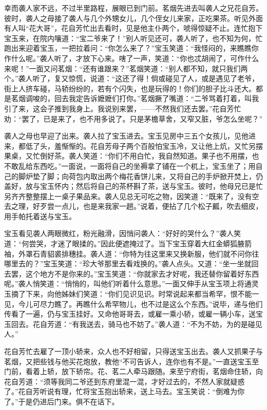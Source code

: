 \documentclass[12pt,oneside]{book}
\begin{document}
幸而袭人家不远，不过半里路程，展眼已到门前。茗烟先进去叫袭人之兄花自芳。彼时，袭人之母接了袭人与几个外甥女儿，几个侄女儿来家，正吃果茶。听见外面有人叫“花大哥”，花自芳忙出去看时，见是他主仆两个，唬得惊疑不止。连忙抱下宝玉来，在院内嚷道：“宝二爷来了！”别人听见还可，袭人听了，也不知为何，忙跑出来迎着宝玉，一把拉着问：“你怎么来了？”宝玉笑道：“我怪闷的，来瞧瞧你作什么呢。”袭人听了，才放下心来。嗐了一声，笑道：“你也忒胡闹了，可作什么来呢！”一面又问茗烟：“还有谁跟来？”茗烟笑道：“别人都不知，就只我们两个。”袭人听了，复又惊慌，说道：“这还了得！倘或碰见了人，或是遇见了老爷，街上人挤车碰，马轿纷纷的，若有个闪失，也是玩得的！你们的胆子比斗还大。都是茗烟调唆的，回去我定告诉嬷嬷们打你。”茗烟撅了嘴道：“二爷骂着打着，叫我引了来，这会子推到我身上。我说别来罢，——不然我们还去罢。”花自芳忙劝：“罢了，已是来了，也不用多说了。只是茅檐草舍，又窄又脏，爷怎么坐呢？”

袭人之母也早迎了出来。袭人拉了宝玉进去。宝玉见房中三五个女孩儿，见他进来，都低了头，羞惭惭的。花自芳母子两个百般怕宝玉冷，又让他上炕，又忙另摆果桌，又忙倒好茶。袭人笑道：“你们不用白忙，我自然知道。果子也不用摆，也不敢乱给东西吃。”一面说，一面将自己的坐褥拿了铺在一个杌上，宝玉坐了；用自己的脚炉垫了脚；向荷包内取出两个梅花香饼儿来，又将自己的手炉掀开焚上，仍盖好，放与宝玉怀内；然后将自己的茶杯斟了茶，送与宝玉。彼时，他母兄已是忙另齐齐整整摆上一桌子果品来。袭人见总无可吃之物，因笑道：“既来了，没有空去之理，好歹尝一点儿，也是来我家一趟。”说着，便拈了几个松子瓤，吹去细皮，用手帕托着送与宝玉。

宝玉看见袭人两眼微红，粉光融滑，因悄问袭人：“好好的哭什么？”袭人笑道：“何尝哭，才迷了眼揉的。”因此便遮掩过了。当下宝玉穿着大红金蟒狐腋箭袖，外罩石青貂裘排穗挂。袭人道：“你特为往这里来又换新服，他们就不问你往哪里去的？”宝玉笑道：“珍大爷那里去看戏换的。”袭人点头。又道：“坐一坐就回去罢，这个地方不是你来的。”宝玉笑道：“你就家去才好呢，我还替你留着好东西呢。”袭人悄笑道：“悄悄的，叫他们听着什么意思。”一面又伸手从宝玉项上将通灵玉摘了下来，向他姊妹们笑道：“你们见识见识。时常说起来都当希罕，恨不能一见，今儿可尽力瞧了。再瞧什么希罕物儿，也不过是这么个东西。”说毕，递与他们传看了一遍，仍与宝玉挂好。又命他哥哥去，或雇一乘小轿，或雇一辆小车，送宝玉回去。花自芳道：“有我送去，骑马也不妨了。”袭人道：“不为不妨，为的是碰见人。”

花自芳忙去雇了一顶小轿来，众人也不好相留，只得送宝玉出去。袭人又抓果子与茗烟，又把些钱与他买花炮放，教他“不可告诉人，连你也有不是。”一直送宝玉至门前，看着上轿，放下轿帘。花、茗二人牵马跟随。来至宁府街，茗烟命住轿，向花自芳道：“须等我同二爷还到东府里混一混，才好过去的，不然人家就疑惑了。”花自芳听说有理，忙将宝玉抱出轿来，送上马去。宝玉笑说：“倒难为你了。”于是仍进后门来。俱不在话下。
\end{document}
